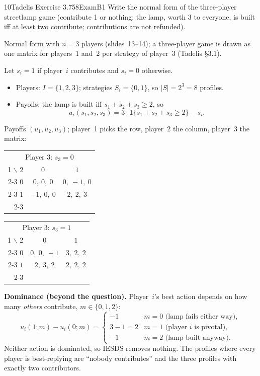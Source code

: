 \begin{exsol}{10}{Tadelis Exercise 3.7}{58}{Exam}{B1}
\asked Write the normal form of the three-player streetlamp game (contribute 1 or nothing; the
lamp, worth 3 to everyone, is built iff at least two contribute; contributions are not
refunded).

\method Normal form with $n = 3$ players (slides~13--14); a three-player game is drawn as one
matrix for players~1 and~2 per strategy of player~3 (Tadelis \S3.1).

\solution
Let $s_i = 1$ if player~$i$ contributes and $s_i = 0$ otherwise.
\begin{itemize}
  \item Players: $I = \{1, 2, 3\}$; strategies $S_i = \{0, 1\}$, so $|S| = 2^3 = 8$ profiles.
  \item Payoffs: the lamp is built iff $s_1 + s_2 + s_3 \ge 2$, so
  \[
    u_i(s_1, s_2, s_3) = 3 \cdot \mathbf{1}\{s_1 + s_2 + s_3 \ge 2\} - s_i .
  \]
\end{itemize}
Payoffs $(u_1, u_2, u_3)$; player~1 picks the row, player~2 the column, player~3 the matrix:
\begin{center}
\begin{tabular}{r|c|c|}
\multicolumn{3}{c}{Player 3: $s_3 = 0$}\\
\multicolumn{1}{r}{1 $\backslash$ 2} & \multicolumn{1}{c}{$0$} & \multicolumn{1}{c}{$1$}\\ \cline{2-3}
$0$ & $0,\ 0,\ 0$ & $0,\ -1,\ 0$ \\ \cline{2-3}
$1$ & $-1,\ 0,\ 0$ & $2,\ 2,\ 3$ \\ \cline{2-3}
\end{tabular}
\qquad
\begin{tabular}{r|c|c|}
\multicolumn{3}{c}{Player 3: $s_3 = 1$}\\
\multicolumn{1}{r}{1 $\backslash$ 2} & \multicolumn{1}{c}{$0$} & \multicolumn{1}{c}{$1$}\\ \cline{2-3}
$0$ & $0,\ 0,\ -1$ & $3,\ 2,\ 2$ \\ \cline{2-3}
$1$ & $2,\ 3,\ 2$ & $2,\ 2,\ 2$ \\ \cline{2-3}
\end{tabular}
\end{center}

\textbf{Dominance (beyond the question).} Player~$i$'s best action depends on how many
\emph{others} contribute, $m \in \{0, 1, 2\}$:
\[
  u_i(1; m) - u_i(0; m) = \begin{cases} -1 & m = 0 \text{ (lamp fails either way)},\\
  3 - 1 = 2 & m = 1 \text{ (player $i$ is pivotal)},\\ -1 & m = 2 \text{ (lamp built anyway)}.\end{cases}
\]
Neither action is dominated, so IESDS removes nothing. The profiles where every player is
best-replying are ``nobody contributes'' and the three profiles with exactly two contributors.


\end{exsol}
